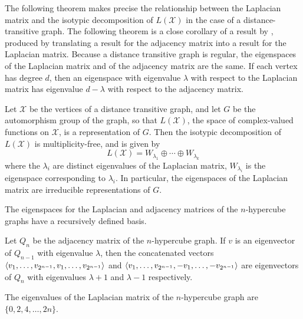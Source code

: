 \documentclass[cclicense]{hmcthesis}
\providecommand*{\xs}{\mathcal X}
\numberwithin{equation}{chapter}
\numberwithin{thmcounter}{chapter}
\begin{document}
    The following theorem makes precise the relationship between the Laplacian
    matrix and the isotypic decomposition of $L(\xs)$ in the case of a
    distance-transitive graph.  The following theorem is a close corollary of a result
    by \citeauthor{Sta84}, produced by translating a result for the adjacency
    matrix into a result for the Laplacian matrix.  Because a distance
    transitive graph is regular, the eigenspaces of the Laplacian matrix and of
    the adjacency matrix are the same.  If each vertex has degree $d$, then an
    eigenspace with eigenvalue $\lambda$ with respect to the Laplacian matrix
    has eigenvalue $d - \lambda$ with respect to the adjacency matrix.
    \begin{theorem}
        Let $\xs$ be the vertices of a distance transitive graph, and let $G$ be
        the automorphism group of the graph, so that $L(\xs)$, the space of
        complex-valued functions on $\xs$, is a representation of $G$.  Then the
        isotypic decomposition of $L(\xs)$ is multiplicity-free, and is given by
        \[
            L(\xs) = W_{\lambda_1} \oplus \cdots \oplus W_{\lambda_k}
        \]
        where the $\lambda_i$ are distinct eigenvalues of the Laplacian matrix,
        $W_{\lambda_i}$ is the eigenspace corresponding to $\lambda_i$.  In
        particular, the eigenspaces of the Laplacian matrix are irreducible
        representations of $G$.
        \label{thm:dist-trans}
    \end{theorem}

    The eigenspaces for the Laplacian and adjacency matrices of the
    $n$-hypercube graphs have a recursively defined basis.
    \begin{theorem}[\cite{CW06}]
        Let $Q_n$ be the adjacency matrix of the $n$-hypercube graph.  If $v$
        is an eigenvector of $Q_{n-1}$ with eigenvalue $\lambda$, then the
        concatenated vectors $\langle v_1, \ldots, v_{2^{n-1}},v_1, \ldots,
        v_{2^{n-1}}\rangle$ and $\langle v_1, \ldots, v_{2^{n-1}}, -v_1, \ldots,
        -v_{2^{n-1}}\rangle$ are eigenvectors of $Q_n$ with eigenvalues $\lambda +1$
        and $\lambda - 1$ respectively.
        \label{thm:eigs}
    \end{theorem}

    \begin{corollary}
        The eigenvalues of the Laplacian matrix of the $n$-hypercube graph are
        $\{0, 2, 4, \ldots, 2n\}$.
        \label{cor:eigs}
    \end{corollary}
\end{document}
